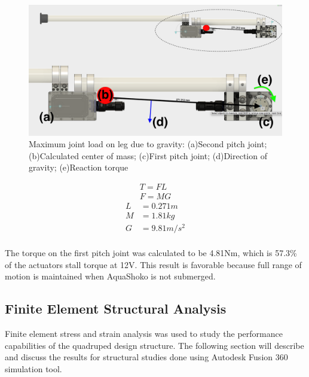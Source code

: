 \begin{figure}[h]
\centering
\includegraphics[width=1.0\columnwidth]{./img/aquaShoko-v3dot3-legCOM.png}
\caption{Maximum joint load on leg due to gravity: (a)Second pitch joint; (b)Calculated center of mass; (c)First pitch joint; (d)Direction of gravity; (e)Reaction torque}
\label{fig:shoko 3dot2}
\end{figure}


\begin{align}\label{eq:head}
    T = FL   \\
    F = MG
\end{align}
\begin{align*}
    L & = 0.271 m         \\
    M & = 1.81 kg       \\
    G & = 9.81 m/s^2    \\
\end{align*}

The torque on the first pitch joint was calculated to be 4.81Nm, which is 57.3\% of the actuators stall torque at 12V. This result is favorable because full range of motion is maintained when AquaShoko is not submerged.

\subsection{Finite Element Structural Analysis}
Finite element stress and strain analysis was used to study the performance capabilities of the quadruped design structure. 
The following section will describe and discuss the results for structural studies done using Autodesk Fusion 360 simulation tool.

